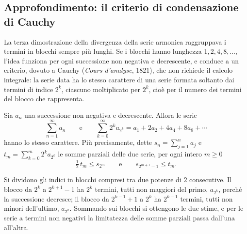 \subsection{Approfondimento: il criterio di condensazione di Cauchy}
\label{subsec:condensazione}

La terza dimostrazione della divergenza della serie armonica raggruppava i termini in
blocchi sempre più lunghi. Se i blocchi hanno lunghezza $1,2,4,8,\dots$, l'idea funziona
per ogni successione non negativa e decrescente, e conduce a un criterio, dovuto a
Cauchy (\emph{Cours d'analyse}, 1821), che non richiede il calcolo integrale: la serie
data ha lo stesso carattere di una serie formata soltanto dai termini di indice $2^{k}$,
ciascuno moltiplicato per $2^{k}$, cioè per il numero dei termini del blocco che
rappresenta.

\begin{teorema}\label{teo:condensazione}
Sia $a_{n}$ una successione non negativa e decrescente. Allora le serie
\begin{equation}\label{eq:condensazione}
  \sum_{n=1}^{\infty}a_{n} \qquad\text{e}\qquad
  \sum_{k=0}^{\infty}2^{k}a_{2^{k}}=a_{1}+2a_{2}+4a_{4}+8a_{8}+\cdots
\end{equation}
hanno lo stesso carattere. Più precisamente, dette $s_{n}=\sum_{j=1}^{n}a_{j}$ e
$t_{m}=\sum_{k=0}^{m}2^{k}a_{2^{k}}$ le somme parziali delle due serie, per ogni intero $m\ge0$
\begin{equation}\label{eq:condensazione-stime}
  \tfrac12\,t_{m}\le s_{2^{m}} \qquad\text{e}\qquad s_{2^{m+1}-1}\le t_{m} .
\end{equation}
\end{teorema}

\begin{schema}
\end{schema}

\begin{strategia}
Si dividono gli indici in blocchi compresi tra due potenze di $2$ consecutive. Il blocco
da $2^{k}$ a $2^{k+1}-1$ ha $2^{k}$ termini, tutti non maggiori del primo, $a_{2^{k}}$, perché la
successione decresce; il blocco da $2^{k-1}+1$ a $2^{k}$ ha $2^{k-1}$ termini, tutti non minori
dell'ultimo, $a_{2^{k}}$. Sommando sui blocchi si ottengono le due stime, e per le serie a
termini non negativi la limitatezza delle somme parziali passa dall'una all'altra.
\end{strategia}

